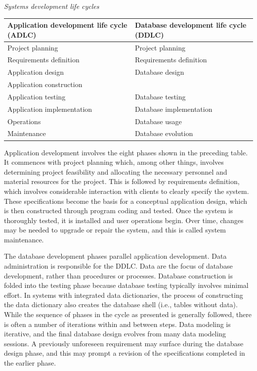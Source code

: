 \documentclass[
]{article}
\begin{document}
\emph{Systems development life cycles}

\begin{longtable}[]{@{}
  >{\raggedright\arraybackslash}p{}
  >{\raggedright\arraybackslash}p{}@{}}
\toprule
Application development life cycle (ADLC) & Database development life cycle (DDLC) \\
\midrule
\endhead
Project planning & Project planning \\
Requirements definition & Requirements definition \\
Application design & Database design \\
Application construction & \\
Application testing & Database testing \\
Application implementation & Database implementation \\
Operations & Database usage \\
Maintenance & Database evolution \\
\bottomrule
\end{longtable}

Application development involves the eight phases shown in the preceding
table. It commences with project planning which, among other things,
involves determining project feasibility and allocating the necessary
personnel and material resources for the project. This is followed by
requirements definition, which involves considerable interaction with
clients to clearly specify the system. These specifications become the
basis for a conceptual application design, which is then constructed
through program coding and tested. Once the system is thoroughly tested,
it is installed and user operations begin. Over time, changes may be
needed to upgrade or repair the system, and this is called system
maintenance.

The database development phases parallel application development. Data
administration is responsible for the DDLC. Data are the focus of
database development, rather than procedures or processes. Database
construction is folded into the testing phase because database testing
typically involves minimal effort. In systems with integrated data
dictionaries, the process of constructing the data dictionary also
creates the database shell (i.e., tables without data). While the
sequence of phases in the cycle as presented is generally followed,
there is often a number of iterations within and between steps. Data
modeling is iterative, and the final database design evolves from many
data modeling sessions. A previously unforeseen requirement may surface
during the database design phase, and this may prompt a revision of the
specifications completed in the earlier phase.
\end{document}

